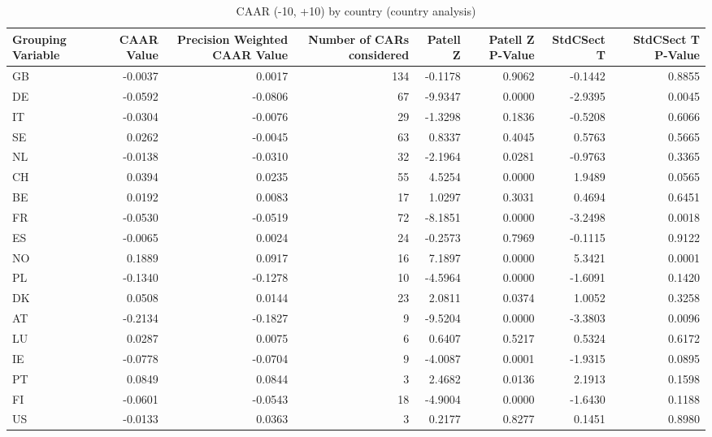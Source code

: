 \begin{table}
\caption{CAAR (-10, +10) by country (country analysis)}
\label{tab:country_caar}
\begin{tabular}{lrrrrrrr}
\toprule
Grouping Variable & CAAR Value & Precision Weighted CAAR Value & Number of CARs considered & Patell Z & Patell Z P-Value & StdCSect T & StdCSect T P-Value \\
\midrule
GB & -0.0037 & 0.0017 & 134 & -0.1178 & 0.9062 & -0.1442 & 0.8855 \\
DE & -0.0592 & -0.0806 & 67 & -9.9347 & 0.0000 & -2.9395 & 0.0045 \\
IT & -0.0304 & -0.0076 & 29 & -1.3298 & 0.1836 & -0.5208 & 0.6066 \\
SE & 0.0262 & -0.0045 & 63 & 0.8337 & 0.4045 & 0.5763 & 0.5665 \\
NL & -0.0138 & -0.0310 & 32 & -2.1964 & 0.0281 & -0.9763 & 0.3365 \\
CH & 0.0394 & 0.0235 & 55 & 4.5254 & 0.0000 & 1.9489 & 0.0565 \\
BE & 0.0192 & 0.0083 & 17 & 1.0297 & 0.3031 & 0.4694 & 0.6451 \\
FR & -0.0530 & -0.0519 & 72 & -8.1851 & 0.0000 & -3.2498 & 0.0018 \\
ES & -0.0065 & 0.0024 & 24 & -0.2573 & 0.7969 & -0.1115 & 0.9122 \\
NO & 0.1889 & 0.0917 & 16 & 7.1897 & 0.0000 & 5.3421 & 0.0001 \\
PL & -0.1340 & -0.1278 & 10 & -4.5964 & 0.0000 & -1.6091 & 0.1420 \\
DK & 0.0508 & 0.0144 & 23 & 2.0811 & 0.0374 & 1.0052 & 0.3258 \\
AT & -0.2134 & -0.1827 & 9 & -9.5204 & 0.0000 & -3.3803 & 0.0096 \\
LU & 0.0287 & 0.0075 & 6 & 0.6407 & 0.5217 & 0.5324 & 0.6172 \\
IE & -0.0778 & -0.0704 & 9 & -4.0087 & 0.0001 & -1.9315 & 0.0895 \\
PT & 0.0849 & 0.0844 & 3 & 2.4682 & 0.0136 & 2.1913 & 0.1598 \\
FI & -0.0601 & -0.0543 & 18 & -4.9004 & 0.0000 & -1.6430 & 0.1188 \\
US & -0.0133 & 0.0363 & 3 & 0.2177 & 0.8277 & 0.1451 & 0.8980 \\
\bottomrule
\end{tabular}
\end{table}
